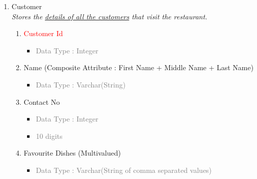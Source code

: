 \begin{enumerate}
        \item Customer \\
        \textit{Stores the \underline{details of all the customers} that visit the restaurant.}
            \begin{enumerate}[label=\alph*.]
                \item\textcolor{red}{Customer Id}
                    \begin{itemize}[label=-]
                        \item \textcolor{gray}{Data Type : Integer}
                    \end{itemize}
                \item Name (Composite Attribute : First Name + Middle Name + Last Name)
                    \begin{itemize}[label=-]
                        \item \textcolor{gray}{Data Type : Varchar(String)}
                    \end{itemize}
                \item Contact No
                    \begin{itemize}[label=-]
                        \item \textcolor{gray}{Data Type : Integer}
                        \item \textcolor{gray}{10 digits}
                    \end{itemize}
                \item Favourite Dishes (Multivalued)
                    \begin{itemize}[label=-]
                        \item \textcolor{gray}{Data Type : Varchar(String of comma separated values)}
                    \end{itemize}
            \end{enumerate}


\end{enumerate}
